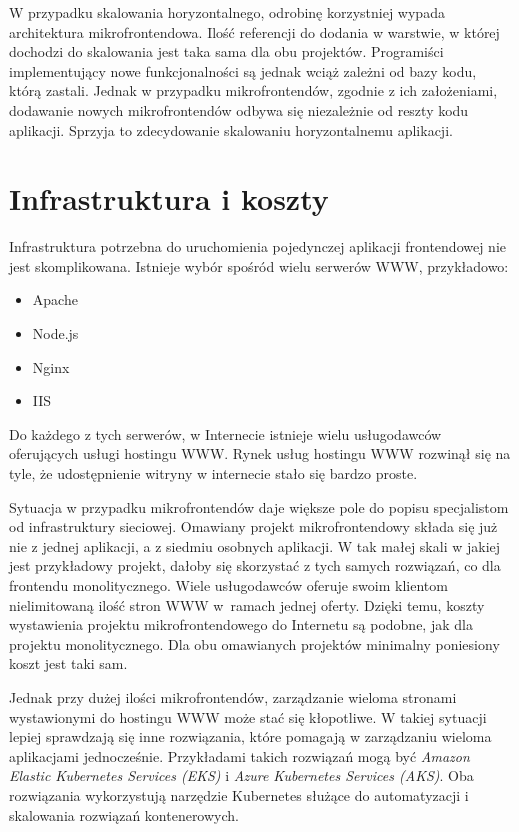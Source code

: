 \documentclass{SGGW-thesis}
\begin{document}
  W przypadku skalowania horyzontalnego, odrobinę korzystniej wypada architektura mikrofrontendowa. Ilość referencji do dodania w warstwie, w której dochodzi do skalowania jest taka sama dla obu projektów. Programiści implementujący nowe funkcjonalności są jednak wciąż zależni od bazy kodu, którą zastali. Jednak w przypadku mikrofrontendów, zgodnie z ich założeniami, dodawanie nowych mikrofrontendów odbywa się niezależnie od reszty kodu aplikacji. Sprzyja to zdecydowanie skalowaniu horyzontalnemu aplikacji.

  \section{Infrastruktura i koszty}
  Infrastruktura potrzebna do uruchomienia pojedynczej aplikacji frontendowej nie jest skomplikowana. Istnieje wybór spośród wielu serwerów WWW, przykładowo:

  \begin{itemize}
    \item Apache
    \item Node.js
    \item Nginx
    \item IIS
  \end{itemize}

  Do każdego z tych serwerów, w Internecie istnieje wielu usługodawców oferujących usługi hostingu WWW. Rynek usług hostingu WWW rozwinął się na tyle, że udostępnienie witryny w internecie stało się bardzo proste.

  Sytuacja w przypadku mikrofrontendów daje większe pole do popisu specjalistom od infrastruktury sieciowej. Omawiany projekt mikrofrontendowy składa się już nie z jednej aplikacji, a z siedmiu osobnych aplikacji. W tak małej skali w jakiej jest przykładowy projekt, dałoby się skorzystać z tych samych rozwiązań, co dla frontendu monolitycznego. Wiele usługodawców \cite{ovh, az} oferuje swoim klientom nielimitowaną ilość stron WWW w~ramach jednej oferty. Dzięki temu, koszty wystawienia projektu mikrofrontendowego do Internetu są podobne, jak dla projektu monolitycznego. Dla obu omawianych projektów minimalny poniesiony koszt jest taki sam.
  
  Jednak przy dużej ilości mikrofrontendów, zarządzanie wieloma stronami wystawionymi do hostingu WWW może stać się kłopotliwe. W takiej sytuacji lepiej sprawdzają się inne rozwiązania, które pomagają w zarządzaniu wieloma aplikacjami jednocześnie. Przykładami takich rozwiązań mogą być \textit{Amazon Elastic Kubernetes Services (EKS)} i \textit{Azure Kubernetes Services (AKS)}. Oba rozwiązania wykorzystują narzędzie Kubernetes \cite{kubernetes} służące do automatyzacji i skalowania rozwiązań kontenerowych.
\end{document}
